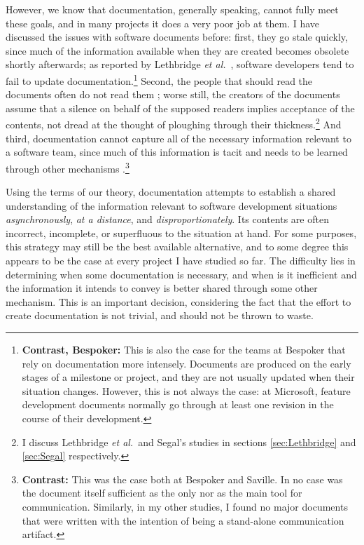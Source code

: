 However, we know that documentation, generally speaking, cannot fully meet these goals, and in many projects it does a very poor job at them. I have discussed the issues with software documents before: first, they go stale quickly, since much of the information available when they are created becomes obsolete shortly afterwards; as reported by Lethbridge \emph{et al.}\ , software developers tend to fail to update documentation.\footnote{\textbf{Contrast, Bespoker:} This is also the case for the teams at Bespoker that rely on documentation more intensely. Documents are produced on the early stages of a milestone or project, and they are not usually updated when their situation changes. However, this is not always the case: at Microsoft, feature development documents normally go through at least one revision in the course of their development.} Second, the people that should read the documents often do not read them \cite{Segal2005}; worse still, the creators of the documents assume that a silence on behalf of the supposed readers implies acceptance of the contents, not dread at the thought of ploughing through their thickness.\footnote{I discuss Lethbridge \emph{et al.}\ and Segal's studies in sections \ref{sec:Lethbridge} and \ref{sec:Segal} respectively.} And third, documentation cannot capture all of the necessary information relevant to a software team, since much of this information is tacit and needs to be learned through other mechanisms \cite{Schon1984}.\footnote{\textbf{Contrast:} This was the case both at Bespoker and Saville. In no case was the document itself sufficient as the only nor as the main tool for communication. Similarly, in my other studies, I found no major documents that were written with the intention of being a stand-alone communication artifact.}

Using the terms of our theory, documentation attempts to establish a shared understanding of the information relevant to software development situations \emph{asynchronously}, \emph{at a distance}, and \emph{disproportionately}. Its contents are often incorrect, incomplete, or superfluous to the situation at hand. For some purposes, this strategy may still be the best available alternative, and to some degree this appears to be the case at every project I have studied so far. The difficulty lies in determining when some documentation is necessary, and when is it inefficient and the information it intends to convey is better shared through some other mechanism. This is an important decision, considering the fact that the effort to create documentation is not trivial, and should not be thrown to waste.



